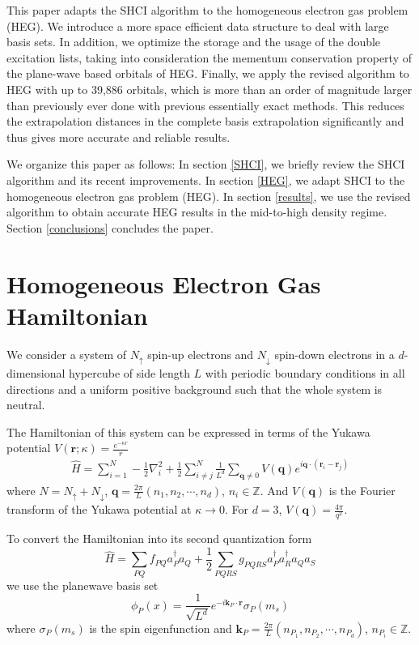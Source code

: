 This paper adapts the SHCI algorithm to the homogeneous electron gas problem (HEG).
We introduce a more space efficient data structure to deal with large basis sets.
In addition, we optimize the storage and the usage of the double excitation lists, taking into consideration the mementum conservation property of the plane-wave based orbitals of HEG.
Finally, we apply the revised algorithm to HEG with up to 39,886 orbitals, which is more than an order of magnitude larger than previously ever done with previous essentially exact methods.
This reduces the extrapolation distances in the complete basis extrapolation significantly and thus gives more accurate and reliable results.

We organize this paper as follows:
In section \ref{SHCI}, we briefly review the SHCI algorithm and its recent improvements.
In section \ref{HEG}, we adapt SHCI to the homogeneous electron gas problem (HEG).
In section \ref{results}, we use the revised algorithm to obtain accurate HEG results in the mid-to-high density regime.
Section \ref{conclusions} concludes the paper.

\section{Homogeneous Electron Gas Hamiltonian}
\label{app:heg}
We consider a system of $N_\uparrow$ spin-up electrons and $N_\downarrow$ spin-down electrons in a $d$-dimensional hypercube of side length $L$ with periodic boundary conditions in all directions and a uniform positive background such that the whole system is neutral.

The Hamiltonian of this system can be expressed in terms of the Yukawa potential $V\left( {\mathbf{r};\kappa } \right) = \frac{{{e^{ - \kappa r}}}}{r}$
\begin{align*}
\hat{H}=\sum_{i=1}^{N}-\frac{1}{2}\nabla_i^2+\frac{1}{2}\sum_{i\ne j}^{N} \frac{1}{L^d}\sum_{\mathbf{q}\ne 0}V(\mathbf{q})e^{i\mathbf{q}\cdot(\mathbf{r}_i-\mathbf{r}_j)}
\end{align*}
where 
$N= N_\uparrow + N_\downarrow$,
$\mathbf{q}=\frac{2\pi}{L}(n_1, n_2, \cdots, n_d)$, $n_i\in\mathbb{Z}$.
And $V(\mathbf{q})$ is the Fourier transform of the Yukawa potential at $\kappa\to 0$.
For $d=3$, $V(\mathbf{q})=\frac{4\pi}{q^2}$. \cite{giuliani2005quantum}

To convert the Hamiltonian into its second quantization form
$$\hat{H}=\sum_{PQ}f_{PQ}a_P^\dag a_Q+\frac{1}{2}\sum_{PQRS}g_{PQRS}a_P^\dag a_R^\dag a_Qa_S$$
we use the planewave basis set
$$\phi_P(x)=\frac{1}{\sqrt{L^d}}e^{-i\mathbf{k}_P\cdot\mathbf{r}}\sigma_P(m_s)$$
where $\sigma_P(m_s)$ is the spin eigenfunction and $\mathbf{k}_P=\frac{2\pi}{L}(n_{P_1}, n_{P_2},\cdots, n_{P_d})$, $n_{P_i}\in\mathbb{Z}$.

